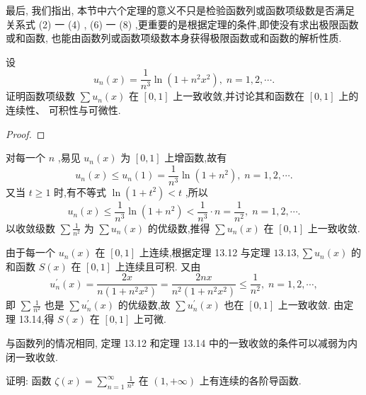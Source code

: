 最后, 我们指出, 本节中六个定理的意义不只是检验函数列或函数项级数是否满足关系式 (2) 一 (4) , (6) 一 (8) ,更重要的是根据定理的条件,即使没有求出极限函数或和函数, 也能由函数列或函数项级数本身获得极限函数或和函数的解析性质.

\begin{example}

\end{example}
设
\[
{u}_{n}\left( x\right)  = \frac{1}{{n}^{3}}\ln \left( {1 + {n}^{2}{x}^{2}}\right) ,\;n = 1,2,\cdots .
\]
证明函数项级数 \(\sum {u}_{n}\left( x\right)\) 在 \(\left\lbrack  {0,1}\right\rbrack\) 上一致收敛,并讨论其和函数在 \(\left\lbrack  {0,1}\right\rbrack\) 上的连续性、 可积性与可微性.

\begin{proof}

\end{proof}
对每一个 \(n\) ,易见 \({u}_{n}\left( x\right)\) 为 \(\left\lbrack  {0,1}\right\rbrack\) 上增函数,故有
\[
{u}_{n}\left( x\right)  \leq  {u}_{n}\left( 1\right)  = \frac{1}{{n}^{3}}\ln \left( {1 + {n}^{2}}\right) ,\;n = 1,2,\cdots .
\]
又当 \(t \geq  1\) 时,有不等式 \(\ln \left( {1 + {t}^{2}}\right)  < t\) ,所以
\[
{u}_{n}\left( x\right)  \leq  \frac{1}{{n}^{3}}\ln \left( {1 + {n}^{2}}\right)  < \frac{1}{{n}^{3}} \cdot  n = \frac{1}{{n}^{2}},\;n = 1,2,\cdots .
\]
以收敛级数 \(\sum \frac{1}{{n}^{2}}\) 为 \(\sum {u}_{n}\left( x\right)\) 的优级数,推得 \(\sum {u}_{n}\left( x\right)\) 在 \(\left\lbrack  {0,1}\right\rbrack\) 上一致收敛.

由于每一个 \({u}_{n}\left( x\right)\) 在 \(\left\lbrack  {0,1}\right\rbrack\) 上连续,根据定理 13.12 与定理 \({13.13},\sum {u}_{n}\left( x\right)\) 的和函数 \(S\left( x\right)\) 在 \(\left\lbrack  {0,1}\right\rbrack\) 上连续且可积. 又由
\[
{u}_{n}^{\prime }\left( x\right)  = \frac{2x}{n\left( {1 + {n}^{2}{x}^{2}}\right) } = \frac{2nx}{{n}^{2}\left( {1 + {n}^{2}{x}^{2}}\right) } \leq  \frac{1}{{n}^{2}},\;n = 1,2,\cdots ,
\]
即 \(\sum \frac{1}{{n}^{2}}\) 也是 \(\sum {u}_{n}^{\prime }\left( x\right)\) 的优级数,故 \(\sum {u}_{n}^{\prime }\left( x\right)\) 也在 \(\left\lbrack  {0,1}\right\rbrack\) 上一致收敛. 由定理 13.14,得 \(S\left( x\right)\) 在 \(\left\lbrack  {0,1}\right\rbrack\) 上可微.

与函数列的情况相同, 定理 13.12 和定理 13.14 中的一致收敛的条件可以减弱为内闭一致收敛.

\begin{example}

\end{example}
证明: 函数 \(\zeta \left( x\right)  = \mathop{\sum }\limits_{{n = 1}}^{\infty }\frac{1}{{n}^{x}}\) 在 \(\left( {1, + \infty }\right)\) 上有连续的各阶导函数.

